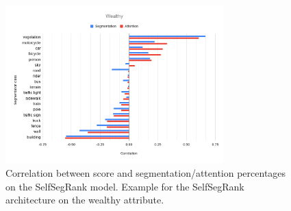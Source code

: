 \begin{figure}[ht]
	\begin{center}
	\includegraphics[width=0.75\textwidth]{./figures/selfsegrank_correlation.png}
	\caption[SelfSegRank Correlation]{
		Correlation between score and segmentation/attention percentages on the
		SelfSegRank model. Example for the SelfSegRank architecture on the wealthy attribute.
        }
	\label{fig:correlation_selfsegrank}
	\end{center}
\end{figure}

